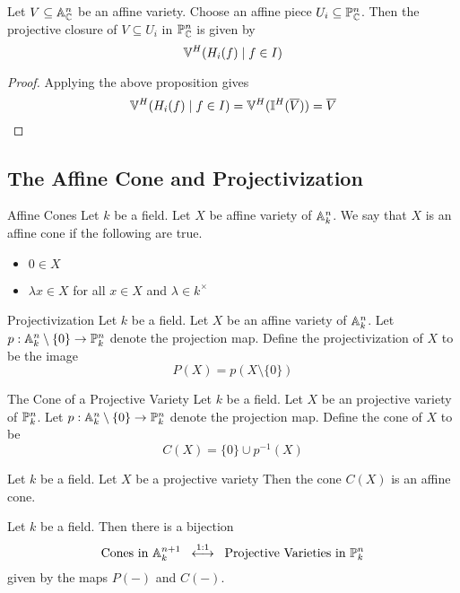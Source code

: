 \documentclass[a4paper]{article}
\begin{document}
\begin{crl}{}{} Let $V\subseteq\mathbb{A}_{\mathbb{C}}^n$ be an affine variety. Choose an affine piece $U_i\subseteq\mathbb{P}_{\mathbb{C}}^n$. Then the projective closure of $V\subseteq U_i$ in $\mathbb{P}_{\mathbb{C}}^n$ is given by $$\mathbb{V}^H(H_i(f)\;|\;f\in I)$$ \tcbline
\begin{proof}
Applying the above proposition gives $$\mathbb{V}^H(H_i(f)\;|\;f\in I)=\mathbb{V}^H(\mathbb{I}^H(\overline{V}))=\overline{V}$$
\end{proof}
\end{crl}

\subsection{The Affine Cone and Projectivization}
\begin{defn}{Affine Cones}{} Let $k$ be a field. Let $X$ be affine variety of $\mathbb{A}_k^n$. We say that $X$ is an affine cone if the following are true. 
\begin{itemize}
\item $0\in X$
\item $\lambda x\in X$ for all $x\in X$ and $\lambda\in k^\times$
\end{itemize}
\end{defn}

\begin{defn}{Projectivization}{} Let $k$ be a field. Let $X$ be an affine variety of $\mathbb{A}_k^n$. Let $p:\mathbb{A}_k^n\setminus\{0\}\to\mathbb{P}_k^n$ denote the projection map. Define the projectivization of $X$ to be the image $$P(X)=p(X\setminus\{0\})$$
\end{defn}

\begin{defn}{The Cone of a Projective Variety}{} Let $k$ be a field. Let $X$ be an projective variety of $\mathbb{P}_k^n$. Let $p:\mathbb{A}_k^n\setminus\{0\}\to\mathbb{P}_k^n$ denote the projection map. Define the cone of $X$ to be $$C(X)=\{0\}\cup p^{-1}(X)$$
\end{defn}

\begin{lmm}{}{} Let $k$ be a field. Let $X$ be a projective variety Then the cone $C(X)$ is an affine cone. 
\end{lmm}

\begin{prp}{}{} Let $k$ be a field. Then there is a bijection $$\text{Cones in }\mathbb{A}_k^{n+1}\;\;\overset{1:1}{\longleftrightarrow}\;\;\text{Projective Varieties in }\mathbb{P}_k^n$$ given by the maps $P(-)$ and $C(-)$. 
\end{prp}
\end{document}
